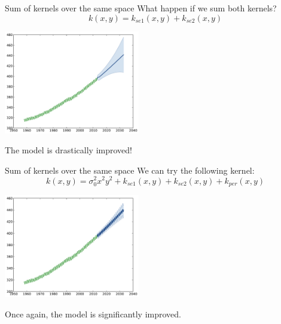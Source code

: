 \documentclass{beamer}
\begin{document}
\begin{frame}{Sum of kernels over the same space }
What happen if we sum both kernels?
\begin{equation*}
k(x,y) = k_{se1}(x,y) + k_{se2}(x,y)
\end{equation*}
\pause
\begin{center}
\vspace{-8mm} \includegraphics[height=4.5cm]{figures/python/CO2-rbfab}
\end{center}
\begin{block}{}
\centering
\alert{The model is drastically improved!}
\end{block}
\end{frame}

\begin{frame}{Sum of kernels over the same space }
We can try the following kernel:
\begin{equation*}
k(x,y) = \sigma_0^2  x^2 y^2 + k_{se1}(x,y) + k_{se2}(x,y) + k_{per}(x,y)
\end{equation*}
\pause
\begin{center}
\vspace{-8mm}  \includegraphics[height=4.5cm]{figures/python/CO2-rbfabpq}
\end{center}
\begin{block}{}
\centering
\alert{Once again, the model is significantly improved.}
\end{block}
\end{frame}
\end{document}
